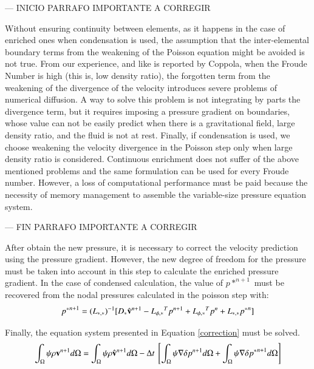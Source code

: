 --- INICIO PARRAFO IMPORTANTE A CORREGIR

Without ensuring continuity between elements, as it happens in the case of enriched ones when condensation is used, the assumption that the inter-elemental boundary terms from the weakening of the Poisson equation might be avoided is not true. From our experience, and like is reported by Coppola\cite{Coppola05}, when the Froude Number is high (this is, low density ratio), the forgotten term from the weakening of the divergence of the velocity introduces severe problems of numerical diffusion. A way to solve this problem is not integrating by parts the divergence term, but it requires imposing a pressure gradient on boundaries, whose value can not be easily predict when there is a gravitational field, large density ratio, and the fluid is not at rest. Finally, if condensation is used, we choose weakening the velocity divergence in the Poisson step only when large density ratio is considered. Continuous enrichment does not suffer of the above mentioned problems and the same formulation can be used for every Froude number. However, a loss of computational performance must be paid because the necessity of memory management to assemble the variable-size pressure equation system.

--- FIN PARRAFO IMPORTANTE A CORREGIR

% 

After obtain the new pressure, it is necessary to correct the velocity prediction using the pressure gradient. However, the new degree of freedom for the pressure must be taken into account in this step to calculate the enriched pressure gradient. In the case of condensed calculation, the value of $p*^{n+1}$ must be recovered from the nodal pressures calculated in the poisson step with:
\begin{equation}
  {p^*}^{n+1} = {(L_{*,*})}^{-1}[D_* \hat{\mathbf{v}}^{n+1} - {L_{\phi,*}}^Tp^{n+1} + {L_{\phi,*}}^Tp^{n} + L_{*,*}{p^*}^n]
  \label{recovering}
\end{equation}

Finally, the equation system presented in Equation \ref{correction} must be solved.
 \begin{equation}
  \int_{\Omega} \psi \rho \vv^{n+1} d\Omega = \int_{\Omega} \psi \rho \hat{\vv}^{n+1} d\Omega - \Delta t \ \left[\int_{\Omega} \psi \nabla \delta p^{n+1} d\Omega + \int_{\Omega} \psi \nabla \delta {p^*}^{n+1} d\Omega \right]
  \label{correction}
 \end{equation}

